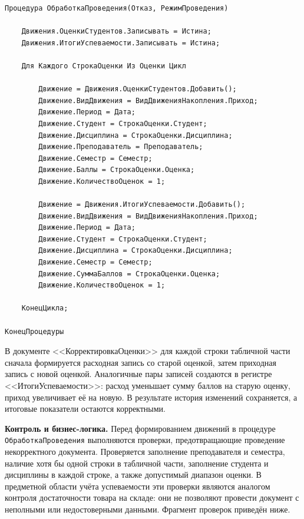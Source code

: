 \documentclass[14pt,a4paper]{extarticle}
\begin{document}
{\small
\begin{verbatim}
Процедура ОбработкаПроведения(Отказ, РежимПроведения)

    Движения.ОценкиСтудентов.Записывать = Истина;
    Движения.ИтогиУспеваемости.Записывать = Истина;

    Для Каждого СтрокаОценки Из Оценки Цикл

        Движение = Движения.ОценкиСтудентов.Добавить();
        Движение.ВидДвижения = ВидДвиженияНакопления.Приход;
        Движение.Период = Дата;
        Движение.Студент = СтрокаОценки.Студент;
        Движение.Дисциплина = СтрокаОценки.Дисциплина;
        Движение.Преподаватель = Преподаватель;
        Движение.Семестр = Семестр;
        Движение.Баллы = СтрокаОценки.Оценка;
        Движение.КоличествоОценок = 1;

        Движение = Движения.ИтогиУспеваемости.Добавить();
        Движение.ВидДвижения = ВидДвиженияНакопления.Приход;
        Движение.Период = Дата;
        Движение.Студент = СтрокаОценки.Студент;
        Движение.Дисциплина = СтрокаОценки.Дисциплина;
        Движение.Семестр = Семестр;
        Движение.СуммаБаллов = СтрокаОценки.Оценка;
        Движение.КоличествоОценок = 1;

    КонецЦикла;

КонецПроцедуры
\end{verbatim}
}

В документе <<КорректировкаОценки>> для каждой строки табличной части сначала
формируется расходная запись со старой оценкой, затем приходная запись с новой
оценкой. Аналогичные пары записей создаются в регистре
<<ИтогиУспеваемости>>: расход уменьшает сумму баллов на старую оценку, приход
увеличивает её на новую. В результате история изменений сохраняется, а итоговые
показатели остаются корректными.

\noindent\textbf{Контроль и бизнес-логика.}
Перед формированием движений в процедуре \texttt{ОбработкаПроведения}
выполняются проверки, предотвращающие проведение некорректного документа.
Проверяется заполнение преподавателя и семестра, наличие хотя бы одной строки
в табличной части, заполнение студента и дисциплины в каждой строке, а также
допустимый диапазон оценки. В предметной области учёта успеваемости эти
проверки являются аналогом контроля достаточности товара на складе: они не
позволяют провести документ с неполными или недостоверными данными. Фрагмент
проверок приведён ниже.
\end{document}
